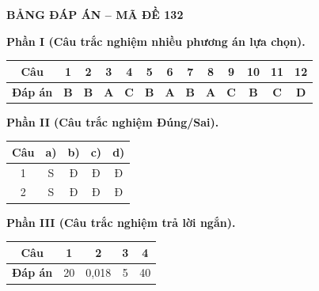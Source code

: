 \vspace{0.4cm}
\noindent\begin{minipage}{\linewidth}
\begin{center}{\large\bfseries\color{red!80!black} BẢNG ĐÁP ÁN -- MÃ ĐỀ 132}\end{center}
\vspace{0.15cm}
\noindent\textbf{Phần I (Câu trắc nghiệm nhiều phương án lựa chọn).}\par\smallskip
\begin{center}
\begin{tabular}{|c|c|c|c|c|c|c|c|c|c|c|c|c|}\hline
\textbf{Câu} & 1 & 2 & 3 & 4 & 5 & 6 & 7 & 8 & 9 & 10 & 11 & 12 \\ \hline
\textbf{Đáp án} & \textbf{B} & \textbf{B} & \textbf{A} & \textbf{C} & \textbf{B} & \textbf{A} & \textbf{B} & \textbf{A} & \textbf{C} & \textbf{B} & \textbf{C} & \textbf{D} \\ \hline
\end{tabular}
\end{center}
\noindent\textbf{Phần II (Câu trắc nghiệm Đúng/Sai).}\par\smallskip
\begin{center}
\begin{tabular}{|c|c|c|c|c|}\hline
\textbf{Câu} & \textbf{a)} & \textbf{b)} & \textbf{c)} & \textbf{d)} \\ \hline
1 & S & Đ & Đ & Đ \\ \hline
2 & S & Đ & Đ & Đ \\ \hline
\end{tabular}
\end{center}
\noindent\textbf{Phần III (Câu trắc nghiệm trả lời ngắn).}\par\smallskip
\begin{center}
\begin{tabular}{|c|c|c|c|c|}\hline
\textbf{Câu} & 1 & 2 & 3 & 4 \\ \hline
\textbf{Đáp án} & 20 & 0,018 & 5 & 40 \\ \hline
\end{tabular}
\end{center}
\end{minipage}
